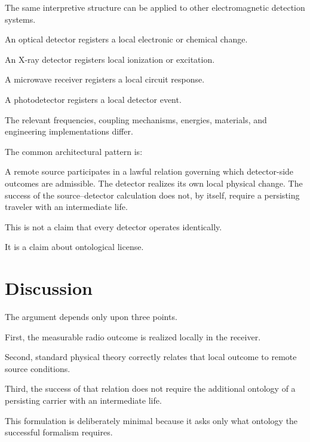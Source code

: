 \documentclass[12pt,onecolumn]{article}
\begin{document}
The same interpretive structure can be applied to other electromagnetic
detection systems.

An optical detector registers a local electronic or chemical change.

An X-ray detector registers local ionization or excitation.

A microwave receiver registers a local circuit response.

A photodetector registers a local detector event.

The relevant frequencies, coupling mechanisms, energies, materials, and
engineering implementations differ.

The common architectural pattern is:

\begin{mdframed}[
linewidth=0.8pt,
innertopmargin=10pt,
innerbottommargin=10pt,
innerrightmargin=14pt,
innerleftmargin=14pt,
backgroundcolor=gray!15,
leftmargin=0.33in,
rightmargin=0.33in
]
\normalsize\itshape

A remote source participates in a lawful relation governing which
detector-side outcomes are admissible. The detector realizes its own
local physical change. The success of the source--detector calculation
does not, by itself, require a persisting traveler with an intermediate
life.

\end{mdframed}

This is not a claim that every detector operates identically.

It is a claim about ontological license.

\section{Discussion}

The argument depends only upon three points.

First, the measurable radio outcome is realized locally in the receiver.

Second, standard physical theory correctly relates that local outcome to
remote source conditions.

Third, the success of that relation does not require the additional
ontology of a persisting carrier with an intermediate life.

This formulation is deliberately minimal because it asks only what
ontology the successful formalism requires.
\end{document}
